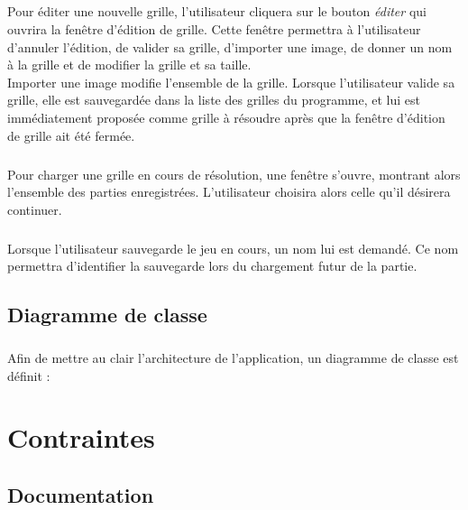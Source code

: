 \paragraph*{}
Pour éditer une nouvelle grille, l'utilisateur cliquera sur le bouton \textit{éditer} qui ouvrira la fenêtre d'édition de grille.
Cette fenêtre permettra à l'utilisateur d'annuler l'édition, de valider sa grille, d'importer une image, de donner un nom à la grille et de modifier la grille et sa taille.\\
Importer une image modifie l'ensemble de la grille.
Lorsque l'utilisateur valide sa grille, elle est sauvegardée dans la liste des grilles du programme, et lui est immédiatement proposée comme grille à résoudre après que la fenêtre d'édition de grille ait été fermée.\\
\paragraph*{}
Pour charger une grille en cours de résolution, une fenêtre s'ouvre, montrant alors l'ensemble des parties enregistrées. L'utilisateur choisira alors celle qu'il désirera continuer.
\paragraph*{}
Lorsque l'utilisateur sauvegarde le jeu en cours, un nom lui est demandé. Ce nom permettra d'identifier la sauvegarde lors du chargement futur de la partie.


\section{Diagramme de classe}
\paragraph*{}
Afin de mettre au clair l'architecture de l'application, un diagramme de classe est définit : 


\chapter{Contraintes}


\section{Documentation}

